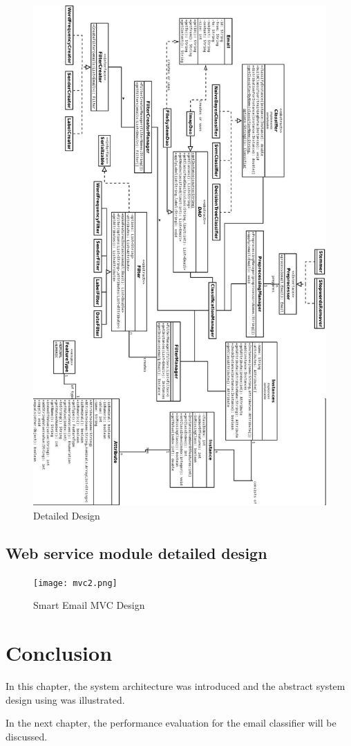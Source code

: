 \begin{figure}
  \centering
  \includegraphics[width=12cm]{design.jpeg}
  \caption[Detailed Design] {Detailed Design}
\end{figure}



\subsection{Web service module detailed design}
\begin{figure}
  \centering
  \texttt{[image: mvc2.png]}
  \caption[Smart Email MVC Design]{Smart Email MVC Design}
\end{figure}


\section{Conclusion}
In this chapter, the system architecture was introduced and the abstract system design using was illustrated.

In the next chapter, the performance evaluation for the email classifier will be discussed.
